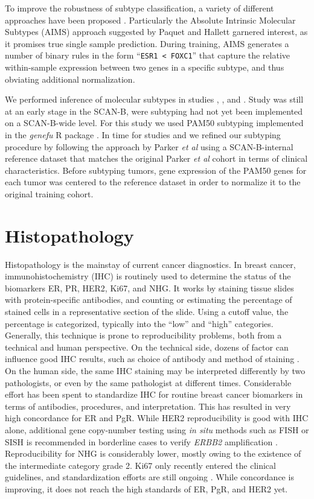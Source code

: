 \documentclass[11pt]{book}
\newcommand{\scanb}{\mbox{SCAN-B}}
\begin{document}
To improve the robustness of subtype classification, a variety of different approaches have been proposed \cite{Paquet:2015-AIMS, Franks:2018, Raj-Kumar:2019, Cascianelli:2020, Chen:2020-subtypes, Yu:2020}. Particularly the Absolute Intrinsic Molecular Subtypes (AIMS) approach suggested by Paquet and Hallett \cite{Paquet:2015-AIMS} garnered interest, as it promises true single sample prediction. During training, AIMS generates a number of binary rules in the form ``\verb|ESR1 < FOXC1|'' that capture the relative within-sample expression between two genes in a specific subtype, and thus obviating additional normalization.

We performed inference of molecular subtypes in studies \I, \III, and \IV. Study \I was still at an early stage in the \scanb{}, were subtyping had not yet been implemented on a \scanb{}-wide level. For this study we used PAM50 subtyping implemented in the \textit{genefu} R package \cite{genefu}. In time for studies \III and \IV we refined our subtyping procedure by following the approach by Parker \textit{et al} \cite{Parker:2009} using a \scanb{}-internal reference dataset that matches the original Parker \textit{et al} cohort in terms of clinical characteristics. Before subtyping tumors, gene expression of the PAM50 genes for each tumor was centered to the reference dataset in order to normalize it to the original training cohort.


\section{Histopathology}

Histopathology is the mainstay of current cancer diagnostics. In breast cancer, immunohistochemistry (IHC) is routinely used to determine the status of the biomarkers ER, PR, HER2, Ki67, and NHG. It works by staining tissue slides with protein-specific antibodies, and counting or estimating the percentage of stained cells in a representative section of the slide. Using a cutoff value, the percentage is categorized, typically into the ``low'' and ``high'' categories. Generally, this technique is prone to reproducibility problems, both from a technical and human perspective. On the technical side, dozens of factor can influence good IHC results, such as choice of antibody and method of staining \cite{MeyerholzBeck:2018}. On the human side, the same IHC staining may be interpreted differently by two pathologists, or even by the same pathologist at different times. Considerable effort has been spent to standardize IHC for routine breast cancer biomarkers in terms of antibodies, procedures, and interpretation. This has resulted in very high concordance for ER and PgR. While HER2 reproducibility is good with IHC alone, additional gene copy-number testing using \textit{in situ} methods such as FISH or SISH is recommended in borderline cases to verify \textit{ERBB2} amplification \cite{Rakha:2015}. Reproducibility for NHG is considerably lower, mostly owing to the existence of the intermediate category grade 2. Ki67 only recently entered the clinical guidelines, and standardization efforts are still ongoing \cite{Leung:2019}. While concordance is improving, it does not reach the high standards of ER, PgR, and HER2 yet.
\end{document}
